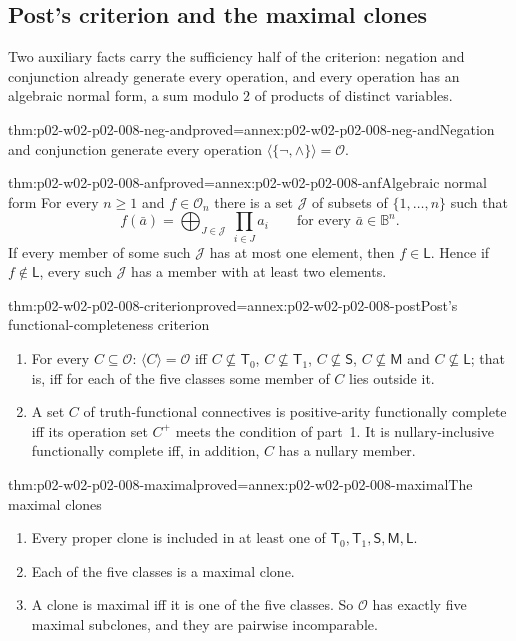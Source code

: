 \subsection{Post's criterion and the maximal clones}
\label{sec:p02-w02-p02-008-criterion}

Two auxiliary facts carry the sufficiency half of the criterion: negation and
conjunction already generate every operation, and every operation has an
algebraic normal form, a sum modulo \(2\) of products of distinct variables.

\begin{hblemma}{thm:p02-w02-p02-008-neg-and}{proved=annex:p02-w02-p02-008-neg-and}{Negation and conjunction generate every operation}
\(\langle\{\neg,\land\}\rangle=\mathcal O\).
\end{hblemma}

\begin{hblemma}{thm:p02-w02-p02-008-anf}{proved=annex:p02-w02-p02-008-anf}{Algebraic normal form}
For every \(n\geq1\) and \(f\in\mathcal O_n\) there is a set \(\mathcal J\)
of subsets of \(\{1,\ldots,n\}\) such that
\[
 f(\bar a)=\bigoplus_{J\in\mathcal J}\ \prod_{i\in J}a_i
 \qquad\text{for every }\bar a\in\mathbb B^n.
\]
If every member of some such \(\mathcal J\) has at most one element, then
\(f\in\mathsf L\).  Hence if \(f\notin\mathsf L\), every such \(\mathcal J\)
has a member with at least two elements.
\end{hblemma}

\begin{hbtheorem}{thm:p02-w02-p02-008-criterion}{proved=annex:p02-w02-p02-008-post}{Post's functional-completeness criterion}
\begin{enumerate}
\item For every \(C\subseteq\mathcal O\): \(\langle C\rangle=\mathcal O\)
  iff \(C\not\subseteq\mathsf T_0\), \(C\not\subseteq\mathsf T_1\),
  \(C\not\subseteq\mathsf S\), \(C\not\subseteq\mathsf M\) and
  \(C\not\subseteq\mathsf L\); that is, iff for each of the five classes
  some member of \(C\) lies outside it.
\item A set \(C\) of truth-functional connectives is positive-arity
  functionally complete iff its operation set \(C^+\) meets the condition of
  part~1.  It is nullary-inclusive functionally complete iff, in addition,
  \(C\) has a nullary member.
\end{enumerate}
\end{hbtheorem}

\begin{hbtheorem}{thm:p02-w02-p02-008-maximal}{proved=annex:p02-w02-p02-008-maximal}{The maximal clones}
\begin{enumerate}
\item Every proper clone is included in at least one of
  \(\mathsf T_0,\mathsf T_1,\mathsf S,\mathsf M,\mathsf L\).
\item Each of the five classes is a maximal clone.
\item A clone is maximal iff it is one of the five classes.  So
  \(\mathcal O\) has exactly five maximal subclones, and they are pairwise
  incomparable.
\end{enumerate}
\end{hbtheorem}

